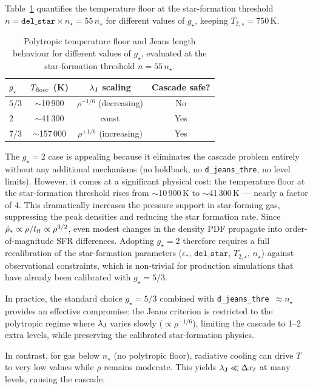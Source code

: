 \documentclass[fleqn,usenatbib]{mnras}
\newcommand{\lJ}{\lambda_{\rm J}}
\newcommand{\nstar}{n_\star}
\newcommand{\Tstar}{T_{2,\star}}
\newcommand{\gstar}{g_\star}
\newcommand{\dx}{\Delta x}
\newcommand{\code}[1]{\texttt{#1}}
\begin{document}
Table~\ref{tab:gstar} quantifies the temperature floor at
the star-formation threshold $n = \code{del\_star}\times\nstar
= 55\,\nstar$ for different values of $\gstar$, keeping
$\Tstar = 750\,$K.

\begin{table}
\centering
\caption{Polytropic temperature floor and Jeans length behaviour
for different values of $\gstar$, evaluated at the star-formation
threshold $n = 55\,\nstar$.}
\label{tab:gstar}
\begin{tabular}{lccc}
\toprule
$\gstar$ & $T_{\rm floor}$ (K) & $\lJ$ scaling & Cascade safe? \\
\midrule
$5/3$  & $\sim$10\,900 & $\rho^{-1/6}$ (decreasing) & No \\
$2$    & $\sim$41\,300 & const & Yes \\
$7/3$  & $\sim$157\,000 & $\rho^{+1/6}$ (increasing) & Yes \\
\bottomrule
\end{tabular}
\end{table}

The $\gstar = 2$ case is appealing because it eliminates the
cascade problem entirely without any additional mechanisms (no
holdback, no \code{d\_jeans\_thre}, no level limits).  However,
it comes at a significant physical cost: the temperature floor
at the star-formation threshold rises from $\sim$10\,900\,K to
$\sim$41\,300\,K --- nearly a factor of 4.  This dramatically
increases the pressure support in star-forming gas, suppressing
the peak densities and reducing the star formation rate.  Since
$\dot{\rho}_* \propto \rho / t_{\rm ff} \propto \rho^{3/2}$, even
modest changes in the density PDF propagate into order-of-magnitude
SFR differences.  Adopting $\gstar = 2$ therefore requires a full
recalibration of the star-formation parameters ($\epsilon_*$,
$\code{del\_star}$, $\Tstar$, $\nstar$) against observational
constraints, which is non-trivial for production simulations that
have already been calibrated with $\gstar = 5/3$.

In practice, the standard choice $\gstar = 5/3$ combined with
\code{d\_jeans\_thre}~$\approx \nstar$ provides an effective
compromise: the Jeans criterion is restricted to the polytropic
regime where $\lJ$ varies slowly ($\propto \rho^{-1/6}$), limiting
the cascade to 1--2 extra levels, while preserving the calibrated
star-formation physics.

In contrast, for gas below $\nstar$ (no polytropic floor), radiative
cooling can drive $T$ to very low values while $\rho$ remains moderate.
This yields $\lJ \ll \dx_\ell$ at many levels, causing the cascade.
\end{document}
